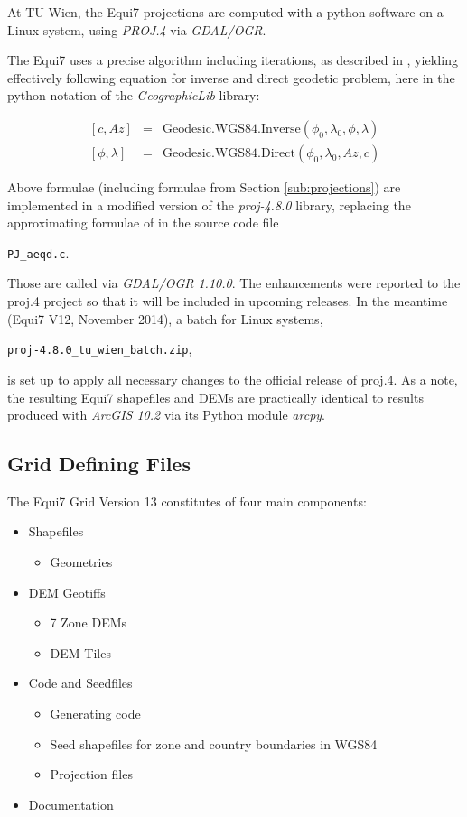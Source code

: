 \documentclass[10pt,a4paper]{article}
\begin{document}
At TU Wien, the Equi7-projections are computed with a python software on a Linux system, using \textit{PROJ.4} via \textit{GDAL/OGR}.

The Equi7 uses a precise algorithm including iterations, as described in \cite{Karney2013}, yielding effectively following equation for inverse and direct geodetic problem, here in the python-notation of the \textit{GeographicLib} library:

\begin{eqnarray}
\left[ c, \mathit{Az} \right] &=& \mathrm{Geodesic.WGS84.Inverse}(\phi_{0}, \lambda_{0}, \phi, \lambda) \\
\left[ \phi , \lambda \right] &=& \mathrm{Geodesic.WGS84.Direct}(\phi_{0}, \lambda_{0}, \mathit{Az}, c)
\label{eq:karney}
\end{eqnarray}

Above formulae (including formulae from Section \ref{sub:projections}) are implemented in a modified version of the \textit{proj-4.8.0} library, replacing the approximating formulae of \citep{Snyder1987} in the source code file

\texttt{PJ\_aeqd.c}. 

Those are called via \textit{GDAL/OGR 1.10.0}. The enhancements were reported to the proj.4 project so that it will be included in upcoming releases. In the meantime (Equi7 V12, November 2014), a batch for Linux systems, 

\texttt{proj-4.8.0\_tu\_wien\_batch.zip},

is set up to apply all necessary changes to the official release of proj.4. As a note, the resulting Equi7 shapefiles and DEMs are practically identical to results produced with \textit{ArcGIS 10.2} via its Python module \textit{arcpy}.

\newpage

\subsection{Grid Defining Files}
\label{definingfiles}

The Equi7 Grid Version 13 constitutes of four main components:

\begin{itemize}[itemsep=0.1ex]
\item Shapefiles
\begin{itemize}
\item Geometries
\end{itemize}
\item DEM Geotiffs
\begin{itemize}
\item 7 Zone DEMs
\item DEM Tiles
\end{itemize}
\item Code and Seedfiles
\begin{itemize}
\item Generating code
\item Seed shapefiles for zone and country boundaries in WGS84
\item Projection files
\end{itemize}
\item Documentation
\end{itemize}
\end{document}
